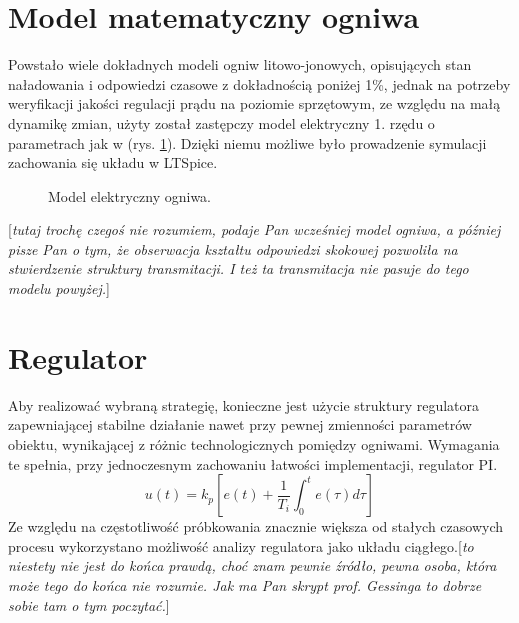 \documentclass[polish,engineer]{polsl-msth}
\newcommand{\remark}[1]{{[\color{GREEN}\emph{\footnotesize #1}{}]}}
\begin{document}
\section{Model matematyczny ogniwa}
Powstało wiele dokładnych modeli\cite{1634598_BATT_MODELS} ogniw litowo-jonowych, opisujących stan naładowania i odpowiedzi czasowe z dokładnością poniżej 1\%, jednak na potrzeby weryfikacji jakości regulacji prądu na poziomie sprzętowym, ze względu na małą dynamikę zmian, użyty został zastępczy model elektryczny 1. rzędu o parametrach jak w \cite{8759769_cellmodel1storder} (rys. \ref{img:thevenin_model}). Dzięki niemu możliwe było prowadzenie symulacji zachowania się układu w LTSpice.
\begin{figure}[hbtp]
    \centering
     \caption{Model elektryczny ogniwa.\label{img:thevenin_model}}
\end{figure}

\remark{tutaj trochę czegoś nie rozumiem, podaje Pan wcześniej model ogniwa,
a później pisze Pan o tym, że obserwacja kształtu odpowiedzi skokowej pozwoliła na stwierdzenie struktury transmitacji. I też ta transmitacja nie pasuje do tego modelu powyżej.}

\section{Regulator}
Aby realizować wybraną strategię, konieczne jest użycie struktury regulatora zapewniającej stabilne działanie nawet przy pewnej zmienności parametrów obiektu, wynikającej z różnic technologicznych pomiędzy ogniwami. Wymagania te spełnia, przy jednoczesnym zachowaniu łatwości implementacji, regulator PI.
\begin{equation}
     u(t)=k_{p}\left[e(t)+{\frac {1}{T_{i}}}\int _{0}^{t}e(\tau )d\tau \right]
     \label{eq:PI_timebased}
\end{equation}
Ze względu na częstotliwość próbkowania znacznie większa od stałych czasowych procesu wykorzystano możliwość analizy regulatora jako układu ciągłego.\remark{to niestety nie jest do końca prawdą, choć znam pewnie źródło, pewna osoba, która może tego do końca nie rozumie. Jak ma Pan skrypt prof. Gessinga to dobrze sobie tam o tym poczytać.}
\end{document}
